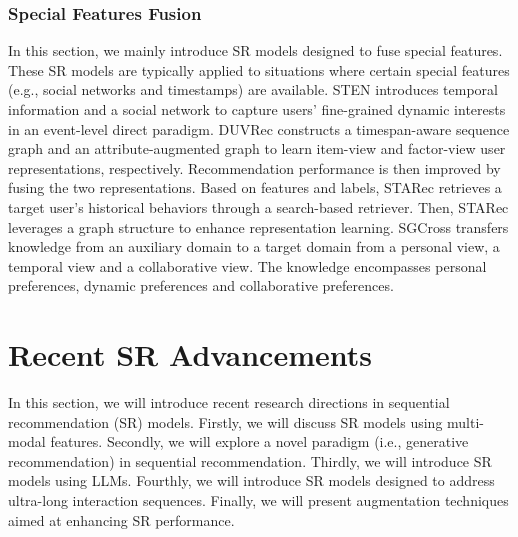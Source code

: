 \documentclass[review]{fcs}
\begin{document}
	\subsubsection{Special Features Fusion}
	In this section, we mainly introduce SR models designed to fuse special features. These SR models are typically applied to situations where certain special features (e.g., social networks and timestamps) are available. STEN \cite{STEN} introduces temporal information and a social network to capture users’ fine-grained dynamic interests in an event-level direct paradigm. DUVRec \cite{DUVRec} constructs a timespan-aware sequence graph and an attribute-augmented graph to learn item-view and factor-view user representations, respectively. Recommendation performance is then improved by fusing the two representations. Based on features and labels, STARec \cite{STARec} retrieves a target user’s historical behaviors through a search-based retriever. Then, STARec \cite{STARec} leverages a graph structure to enhance representation learning. SGCross \cite{SGCross}  transfers knowledge from an auxiliary domain to a target domain from a personal view, a temporal view and a collaborative view. The knowledge encompasses personal preferences, dynamic preferences and collaborative preferences.
	\section{Recent SR Advancements}\label{sec:recent_SR_advancements}
	In this section, we will introduce recent research directions in sequential recommendation (SR) models. Firstly, we will discuss SR models using multi-modal features. Secondly, we will explore a novel paradigm (i.e., generative recommendation) in sequential recommendation. Thirdly, we will introduce SR models using LLMs. Fourthly, we will introduce SR models designed to address ultra-long interaction sequences. Finally, we will present augmentation techniques aimed at enhancing SR performance.
\end{document}
